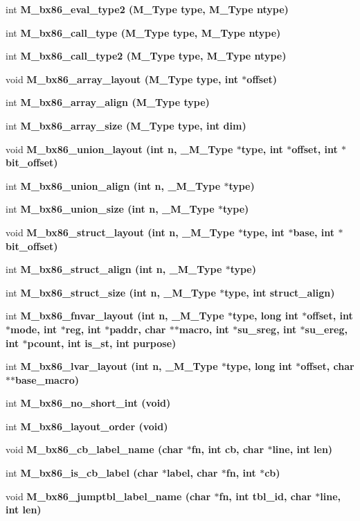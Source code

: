 \begin{CompactItemize}
int \bf{M\_\-bx86\_\-eval\_\-type2} (\bf{M\_\-Type} type, \bf{M\_\-Type} ntype)
\item 
int \bf{M\_\-bx86\_\-call\_\-type} (\bf{M\_\-Type} type, \bf{M\_\-Type} ntype)
\item 
int \bf{M\_\-bx86\_\-call\_\-type2} (\bf{M\_\-Type} type, \bf{M\_\-Type} ntype)
\item 
void \bf{M\_\-bx86\_\-array\_\-layout} (\bf{M\_\-Type} type, int $\ast$offset)
\item 
int \bf{M\_\-bx86\_\-array\_\-align} (\bf{M\_\-Type} type)
\item 
int \bf{M\_\-bx86\_\-array\_\-size} (\bf{M\_\-Type} type, int dim)
\item 
void \bf{M\_\-bx86\_\-union\_\-layout} (int n, \bf{\_\-M\_\-Type} $\ast$type, int $\ast$offset, int $\ast$bit\_\-offset)
\item 
int \bf{M\_\-bx86\_\-union\_\-align} (int n, \bf{\_\-M\_\-Type} $\ast$type)
\item 
int \bf{M\_\-bx86\_\-union\_\-size} (int n, \bf{\_\-M\_\-Type} $\ast$type)
\item 
void \bf{M\_\-bx86\_\-struct\_\-layout} (int n, \bf{\_\-M\_\-Type} $\ast$type, int $\ast$base, int $\ast$bit\_\-offset)
\item 
int \bf{M\_\-bx86\_\-struct\_\-align} (int n, \bf{\_\-M\_\-Type} $\ast$type)
\item 
int \bf{M\_\-bx86\_\-struct\_\-size} (int n, \bf{\_\-M\_\-Type} $\ast$type, int struct\_\-align)
\item 
int \bf{M\_\-bx86\_\-fnvar\_\-layout} (int n, \bf{\_\-M\_\-Type} $\ast$type, long int $\ast$offset, int $\ast$\bf{mode}, int $\ast$reg, int $\ast$paddr, char $\ast$$\ast$macro, int $\ast$su\_\-sreg, int $\ast$su\_\-ereg, int $\ast$pcount, int is\_\-st, int purpose)
\item 
int \bf{M\_\-bx86\_\-lvar\_\-layout} (int n, \bf{\_\-M\_\-Type} $\ast$type, long int $\ast$offset, char $\ast$$\ast$base\_\-macro)
\item 
int \bf{M\_\-bx86\_\-no\_\-short\_\-int} (void)
\item 
int \bf{M\_\-bx86\_\-layout\_\-order} (void)
\item 
void \bf{M\_\-bx86\_\-cb\_\-label\_\-name} (char $\ast$fn, int cb, char $\ast$line, int len)
\item 
int \bf{M\_\-bx86\_\-is\_\-cb\_\-label} (char $\ast$label, char $\ast$fn, int $\ast$cb)
\item 
void \bf{M\_\-bx86\_\-jumptbl\_\-label\_\-name} (char $\ast$fn, int tbl\_\-id, char $\ast$line, int len)

\end{CompactItemize}
